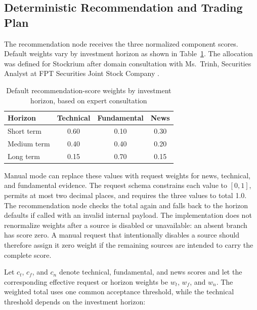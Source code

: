 \subsection{Deterministic Recommendation and Trading Plan}
\label{subsec:analysis-recommendation-controls}

The recommendation node receives the three normalized component scores. Default weights vary by investment horizon as shown in Table~\ref{tab:confidence-horizon-weights}. The allocation was defined for Stockrium after domain consultation with Ms.~Trinh, Securities Analyst at FPT Securities Joint Stock Company \cite{trinh2026weights}.

\begin{table}[H]
    \centering
    \caption{Default recommendation-score weights by investment horizon, based on expert consultation \protect\cite{trinh2026weights}}
    \label{tab:confidence-horizon-weights}
    \small
    \renewcommand{\arraystretch}{1.2}
    \begin{tabular}{lccc}
        \toprule
        \textbf{Horizon} & \textbf{Technical} & \textbf{Fundamental} & \textbf{News} \\
        \midrule
        Short term & 0.60 & 0.10 & 0.30 \\
        Medium term & 0.40 & 0.40 & 0.20 \\
        Long term & 0.15 & 0.70 & 0.15 \\
        \bottomrule
    \end{tabular}
\end{table}

Manual mode can replace these values with request weights for news, technical, and fundamental evidence. The request schema constrains each value to $[0,1]$, permits at most two decimal places, and requires the three values to total 1.0. The recommendation node checks the total again and falls back to the horizon defaults if called with an invalid internal payload. The implementation does not renormalize weights after a source is disabled or unavailable: an absent branch has score zero. A manual request that intentionally disables a source should therefore assign it zero weight if the remaining sources are intended to carry the complete score.

Let $c_t$, $c_f$, and $c_n$ denote technical, fundamental, and news scores and let the corresponding effective request or horizon weights be $w_t$, $w_f$, and $w_n$. The weighted total uses one common acceptance threshold, while the technical threshold depends on the investment horizon:

